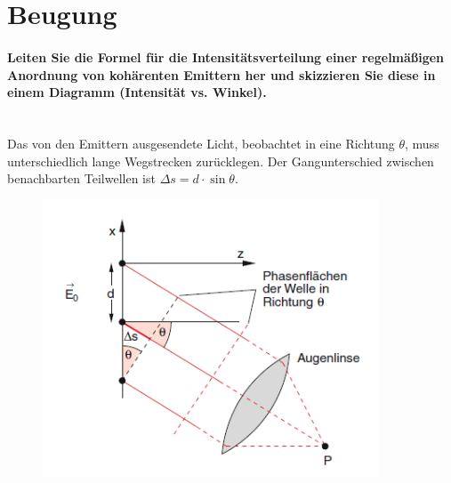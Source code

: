\documentclass[a4paper, 11pt, ngerman, parskip=half-]{scrartcl}
\newcommand{\myparagraph}[1]{\paragraph{#1}\mbox{}\\}
\begin{document}
    \section{Beugung}
    \label{Beugung}

    \myparagraph{Leiten Sie die Formel für die Intensitätsverteilung einer regelmäßigen Anordnung von
        kohärenten Emittern her und skizzieren Sie diese in einem Diagramm (Intensität vs.
        Winkel).}
    Das von den Emittern ausgesendete Licht, beobachtet in eine Richtung $\theta$, muss unterschiedlich lange Wegstrecken zurücklegen. Der Gangunterschied zwischen benachbarten
    Teilwellen ist $\Delta s = d \cdot \sin \theta$.

    \begin{figure}[H]
        \centering
        \includegraphics[width=10cm]{image/19/1.1}
    \end{figure}
\end{document}
